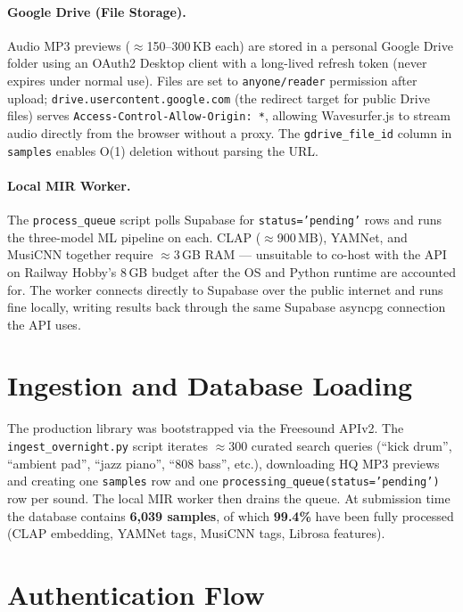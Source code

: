 \documentclass[12pt,letterpaper]{report}
\begin{document}
\paragraph{Google Drive (File Storage).}
Audio MP3 previews ($\approx$150--300\,KB each) are stored in a personal Google Drive folder using an OAuth2 Desktop client with a long-lived refresh token (never expires under normal use). Files are set to \texttt{anyone/reader} permission after upload; \texttt{drive.usercontent.google.com} (the redirect target for public Drive files) serves \texttt{Access-Control-Allow-Origin: *}, allowing Wavesurfer.js to stream audio directly from the browser without a proxy. The \texttt{gdrive\_file\_id} column in \texttt{samples} enables O(1) deletion without parsing the URL.

\paragraph{Local MIR Worker.}
The \texttt{process\_queue} script polls Supabase for \texttt{status='pending'} rows and runs the three-model ML pipeline on each. CLAP ($\approx$900\,MB), YAMNet, and MusiCNN together require $\approx$3\,GB RAM --- unsuitable to co-host with the API on Railway Hobby's 8\,GB budget after the OS and Python runtime are accounted for. The worker connects directly to Supabase over the public internet and runs fine locally, writing results back through the same Supabase asyncpg connection the API uses.

\section{Ingestion and Database Loading}

The production library was bootstrapped via the Freesound APIv2. The \texttt{ingest\_overnight.py} script iterates $\approx$300 curated search queries (``kick drum'', ``ambient pad'', ``jazz piano'', ``808 bass'', etc.), downloading HQ MP3 previews and creating one \texttt{samples} row and one \texttt{processing\_queue(status='pending')} row per sound. The local MIR worker then drains the queue. At submission time the database contains \textbf{6{,}039 samples}, of which \textbf{99.4\%} have been fully processed (CLAP embedding, YAMNet tags, MusiCNN tags, Librosa features).

\section{Authentication Flow}
\end{document}
